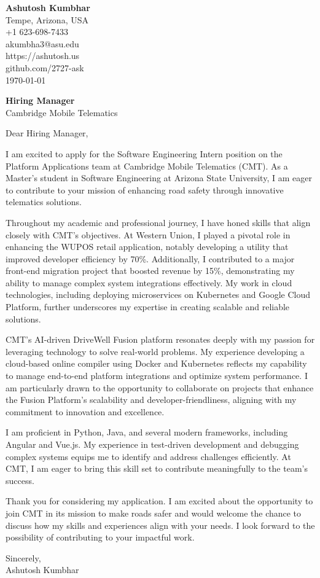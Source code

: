 \documentclass[11pt]{article}
\begin{document}
\begin{flushleft}
\textbf{Ashutosh Kumbhar} \\
Tempe, Arizona, USA \\
+1 623-698-7433 \\
akumbha3@asu.edu \\
https://ashutosh.us \\
github.com/2727-ask \\
\today
\end{flushleft}

\vspace{0.5em}

\textbf{Hiring Manager} \\
Cambridge Mobile Telematics \\

\vspace{1em}

Dear Hiring Manager,

I am excited to apply for the Software Engineering Intern position on the Platform Applications team at Cambridge Mobile Telematics (CMT). As a Master’s student in Software Engineering at Arizona State University, I am eager to contribute to your mission of enhancing road safety through innovative telematics solutions.

Throughout my academic and professional journey, I have honed skills that align closely with CMT's objectives. At Western Union, I played a pivotal role in enhancing the WUPOS retail application, notably developing a utility that improved developer efficiency by 70\%. Additionally, I contributed to a major front-end migration project that boosted revenue by 15\%, demonstrating my ability to manage complex system integrations effectively. My work in cloud technologies, including deploying microservices on Kubernetes and Google Cloud Platform, further underscores my expertise in creating scalable and reliable solutions.

CMT's AI-driven DriveWell\textsuperscript{\textregistered} Fusion platform resonates deeply with my passion for leveraging technology to solve real-world problems. My experience developing a cloud-based online compiler using Docker and Kubernetes reflects my capability to manage end-to-end platform integrations and optimize system performance. I am particularly drawn to the opportunity to collaborate on projects that enhance the Fusion Platform’s scalability and developer-friendliness, aligning with my commitment to innovation and excellence.

I am proficient in Python, Java, and several modern frameworks, including Angular and Vue.js. My experience in test-driven development and debugging complex systems equips me to identify and address challenges efficiently. At CMT, I am eager to bring this skill set to contribute meaningfully to the team’s success.

Thank you for considering my application. I am excited about the opportunity to join CMT in its mission to make roads safer and would welcome the chance to discuss how my skills and experiences align with your needs. I look forward to the possibility of contributing to your impactful work.

Sincerely, \\
Ashutosh Kumbhar
\end{document}
